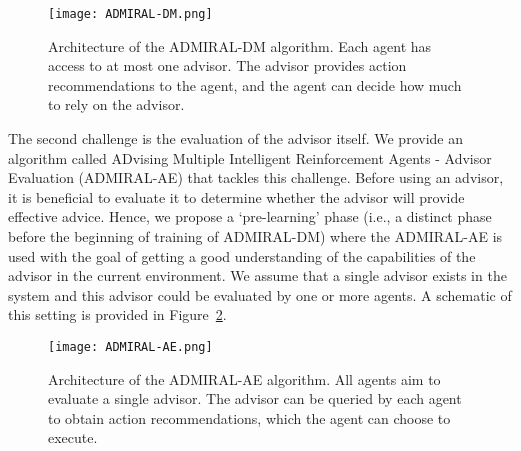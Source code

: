 \documentclass[jair, twoside,11pt,theapa]{article}
\begin{document}
\begin{figure}
    \centering
    \texttt{[image: ADMIRAL-DM.png]}
    \caption{Architecture of the ADMIRAL-DM algorithm. Each agent has access to at most one advisor. The advisor provides action recommendations to the agent, and the agent can decide how much to rely on the advisor.}
    \label{fig:ADMIRALDM}
\end{figure}






The second challenge is the evaluation of the advisor itself. We provide an algorithm called ADvising Multiple Intelligent Reinforcement Agents - Advisor Evaluation (ADMIRAL-AE) that tackles this challenge. Before using an advisor, it is beneficial to  evaluate it  to determine whether the advisor will provide effective advice. Hence, we propose a `pre-learning' phase (i.e., a distinct phase before the beginning of training of ADMIRAL-DM) where the ADMIRAL-AE is used with the goal of getting a good understanding of the capabilities of the advisor in the current environment. We  assume that a single advisor exists in the system and this advisor could be evaluated by one or more agents. A schematic of this setting is provided in Figure~\ref{fig:ADMIRALAE}. 


\begin{figure}
    \centering
    \texttt{[image: ADMIRAL-AE.png]}
    \caption{Architecture of the ADMIRAL-AE algorithm. All agents aim to evaluate a single advisor. The advisor can be queried by each agent to obtain action recommendations, which the agent can choose to execute.}
    \label{fig:ADMIRALAE}
\end{figure}
\end{document}
